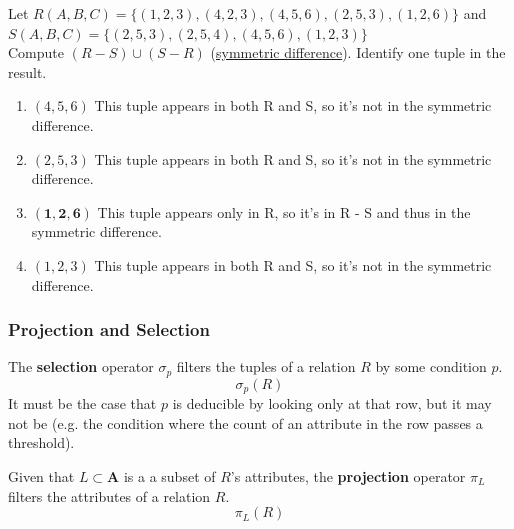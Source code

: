     \begin{example}
      \label{ex:symmetric-difference-of-relations}
      Let $R(A,B,C) = \{(1,2,3), (4,2,3), (4,5,6), (2,5,3), (1,2,6)\}$ and\\
      $S(A,B,C) = \{(2,5,3), (2,5,4), (4,5,6), (1,2,3)\}$\\
      Compute $(R - S) \cup (S - R)$ (\hyperref[st-def:symmetric-difference]{symmetric difference}). Identify one tuple in the result.

      \begin{enumerate}
        \item $(4,5,6)$ This tuple appears in both R and S, so it's not in the symmetric difference.
        
        \item $(2,5,3)$ This tuple appears in both R and S, so it's not in the symmetric difference.
        
        \item $\mathbf{(1,2,6)}$ This tuple appears only in R, so it's in R - S and thus in the symmetric difference.
        
        \item $(1,2,3)$ This tuple appears in both R and S, so it's not in the symmetric difference.
      \end{enumerate}
    \end{example}

  \subsubsection{Projection and Selection}

    \begin{definition}[Selection]
      \label{def:selection}
      The \textbf{selection} operator $\sigma_p$ filters the tuples of a relation $R$ by some condition $p$. 
      \begin{equation}
        \sigma_p (R)
      \end{equation}
      It must be the case that $p$ is deducible by looking only at that row, but it may not be (e.g. the condition where the count of an attribute in the row passes a threshold). 
    \end{definition}

    \begin{definition}[Projection]
      \label{def:projection}
      Given that $L \subset \mathbf{A}$ is a a subset of $R$'s attributes, the \textbf{projection} operator $\pi_L$ filters the attributes of a relation $R$. 
      \begin{equation}
        \pi_L (R)
      \end{equation}
    \end{definition}

